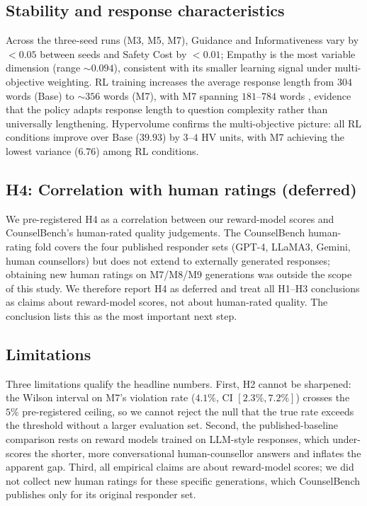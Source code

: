 \documentclass[10pt,twocolumn]{article}
\begin{document}
\subsection*{Stability and response characteristics}

Across the three-seed runs (M3, M5, M7), Guidance and Informativeness vary by $<0.05$ between seeds and Safety Cost by $<0.01$; Empathy is the most variable dimension (range ${\sim}0.094$), consistent with its smaller learning signal under multi-objective weighting. RL training increases the average response length from $304$ words (Base) to ${\sim}356$ words (M7), with M7 spanning $181$--$784$ words ,  evidence that the policy adapts response length to question complexity rather than universally lengthening. Hypervolume \citep{zitzler1999hv} confirms the multi-objective picture: all RL conditions improve over Base ($39.93$) by $3$--$4$ HV units, with M7 achieving the lowest variance ($6.76$) among RL conditions.


\subsection*{H4: Correlation with human ratings (deferred)}

We pre-registered H4 as a correlation between our reward-model scores and CounselBench's human-rated quality judgements. The CounselBench human-rating fold covers the four published responder sets (GPT-4, LLaMA3, Gemini, human counsellors) but does not extend to externally generated responses; obtaining new human ratings on M7/M8/M9 generations was outside the scope of this study. We therefore report H4 as deferred and treat all H1--H3 conclusions as claims about reward-model scores, not about human-rated quality. The conclusion lists this as the most important next step.

\subsection*{Limitations}

Three limitations qualify the headline numbers. First, H2 cannot be sharpened: the Wilson interval on M7's violation rate ($4.1\%$, CI $[2.3\%, 7.2\%]$) crosses the $5\%$ pre-registered ceiling, so we cannot reject the null that the true rate exceeds the threshold without a larger evaluation set. Second, the published-baseline comparison rests on reward models trained on LLM-style responses, which under-scores the shorter, more conversational human-counsellor answers and inflates the apparent gap. Third, all empirical claims are about reward-model scores; we did not collect new human ratings for these specific generations, which CounselBench publishes only for its original responder set.
\end{document}
